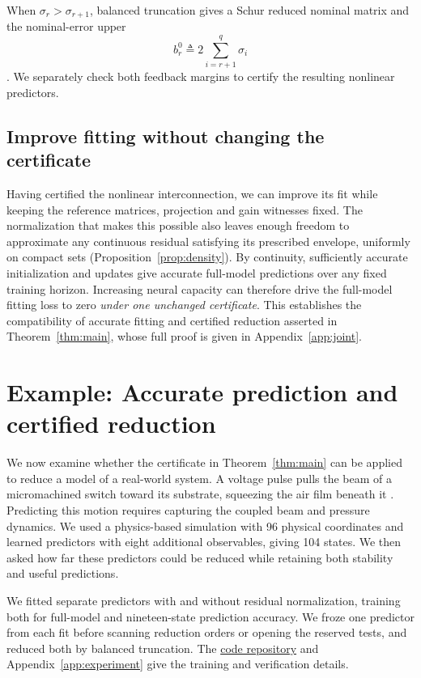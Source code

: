 \documentclass{l4dc2027}
\newcommand{\eqdef}{\triangleq}
\begin{document}
When \mbox{$\sigma_r>\sigma_{r+1}$}, balanced truncation gives a Schur reduced nominal matrix and the nominal-error upper
\begin{equation}\label{eq:balanced-nominal-upper}
 b_r^0\eqdef2\sum_{i=r+1}^q\sigma_i
\end{equation}
\citep{antoulas}.
We separately check both feedback margins to certify the resulting nonlinear predictors.

\subsection{Improve fitting without changing the certificate}
Having certified the nonlinear interconnection, we can improve its fit while keeping the reference matrices, projection and gain witnesses fixed.
The normalization that makes this possible also leaves enough freedom to approximate any continuous residual satisfying its prescribed envelope, uniformly on compact sets (Proposition~\ref{prop:density}).
By continuity, sufficiently accurate initialization and updates give accurate full-model predictions over any fixed training horizon.
Increasing neural capacity can therefore drive the full-model fitting loss to zero \emph{under one unchanged certificate}.
This establishes the compatibility of accurate fitting and certified reduction asserted in Theorem~\ref{thm:main}, whose full proof is given in Appendix~\ref{app:joint}.

\section{Example: Accurate prediction and certified reduction}\label{sec:experiments}

We now examine whether the certificate in Theorem~\ref{thm:main} can be applied to reduce a model of a real-world system. A voltage pulse pulls the beam of a micromachined switch toward its substrate, squeezing the air film beneath it \citep{rewienski}.
Predicting this motion requires capturing the coupled beam and pressure dynamics.
We used a physics-based simulation with 96 physical coordinates and learned predictors with eight additional observables, giving 104 states.
We then asked how far these predictors could be reduced while retaining both stability and useful predictions.

We fitted separate predictors with and without residual normalization, training both for full-model and nineteen-state prediction accuracy.
We froze one predictor from each fit before scanning reduction orders or opening the reserved tests, and reduced both by balanced truncation.
The \href{https://github.com/Populustremuloides/certified-nonlinear-reduction}{code repository} and Appendix~\ref{app:experiment} give the training and verification details.
\end{document}
